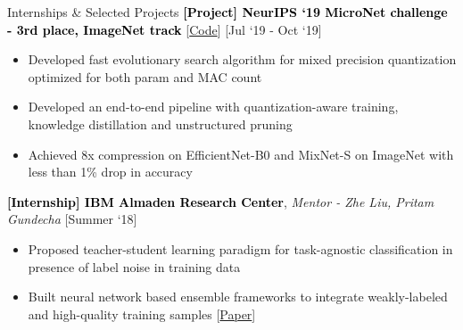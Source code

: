 \documentclass{resume} %
\begin{document}

\vspace{-8pt}

\begin{rSection}{Internships \& Selected Projects}
\vspace*{-0.15cm}
\textcolor{Black}{\textbf{[Project] NeurIPS `19 MicroNet challenge - 3rd place, ImageNet track}} [\href{https://github.com/yashbhalgat/QualcommAI-MicroNet-submission-MixNet}{Code}] \hfill[Jul `19 - Oct `19]\\
\vspace{-16pt}
\begin{itemize}[leftmargin=*]
    \setlength\itemsep{-4pt}
    \item Developed fast evolutionary search algorithm for mixed precision quantization optimized for both param and MAC count
    \item Developed an end-to-end pipeline with quantization-aware training, knowledge distillation and unstructured pruning
    \item Achieved 8x compression on EfficientNet-B0 and MixNet-S on ImageNet with less than 1\% drop in accuracy
\end{itemize}

\vspace*{3pt}

\textcolor{Black}{\textbf{[Internship] IBM Almaden Research Center}}, \textit{Mentor - Zhe Liu, Pritam Gundecha}  \hfill[Summer `18]\\
\vspace{-16pt}
\begin{itemize}[leftmargin=*]
    \setlength\itemsep{-4pt}
    \item Proposed teacher-student learning paradigm for task-agnostic classification in presence of label noise in training data
    \item Built neural network based ensemble frameworks to integrate weakly-labeled and high-quality training samples [\href{https://konvens.org/proceedings/2019/papers/KONVENS2019_paper_52.pdf}{Paper}]
\end{itemize}

\vspace*{3pt}



\end{rSection}
\end{document}
